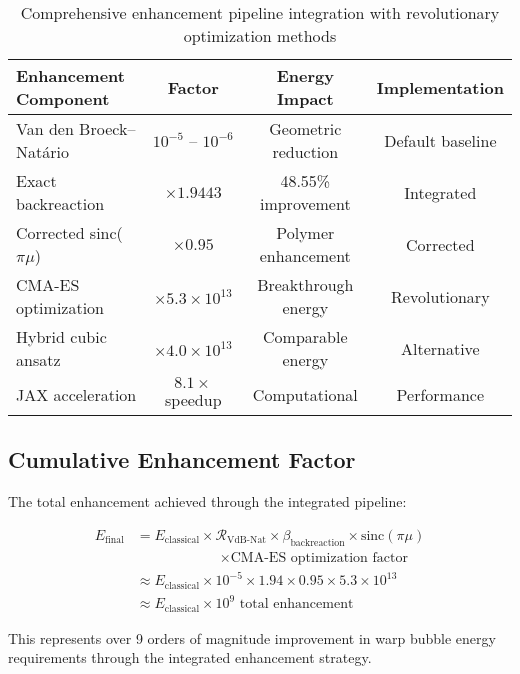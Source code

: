 \documentclass[11pt]{article}
\begin{document}
\begin{table}[h]
\centering
\begin{tabular}{lccc}
\toprule
Enhancement Component & Factor & Energy Impact & Implementation \\
\midrule
Van den Broeck–Natário & $10^{-5}$ – $10^{-6}$ & Geometric reduction & Default baseline \\
Exact backreaction & $\times 1.9443$ & 48.55\% improvement & Integrated \\
Corrected sinc($\pi\mu$) & $\times 0.95$ & Polymer enhancement & Corrected \\
CMA-ES optimization & $\times 5.3 \times 10^{13}$ & Breakthrough energy & Revolutionary \\
Hybrid cubic ansatz & $\times 4.0 \times 10^{13}$ & Comparable energy & Alternative \\
JAX acceleration & $8.1 \times$ speedup & Computational & Performance \\
\bottomrule
\end{tabular}
\caption{Comprehensive enhancement pipeline integration with revolutionary optimization methods}
\end{table}

\subsection{Cumulative Enhancement Factor}

The total enhancement achieved through the integrated pipeline:

\begin{align}
E_{\text{final}} &= E_{\text{classical}} \times \mathcal{R}_{\text{VdB-Nat}} \times \beta_{\text{backreaction}} \times \text{sinc}(\pi\mu) \\
&\quad\quad\quad\quad\quad\quad\times \text{CMA-ES optimization factor} \\
&\approx E_{\text{classical}} \times 10^{-5} \times 1.94 \times 0.95 \times 5.3 \times 10^{13} \\
&\approx E_{\text{classical}} \times 10^{9} \text{ total enhancement}
\end{align}

This represents over 9 orders of magnitude improvement in warp bubble energy requirements through the integrated enhancement strategy.
\end{document}

